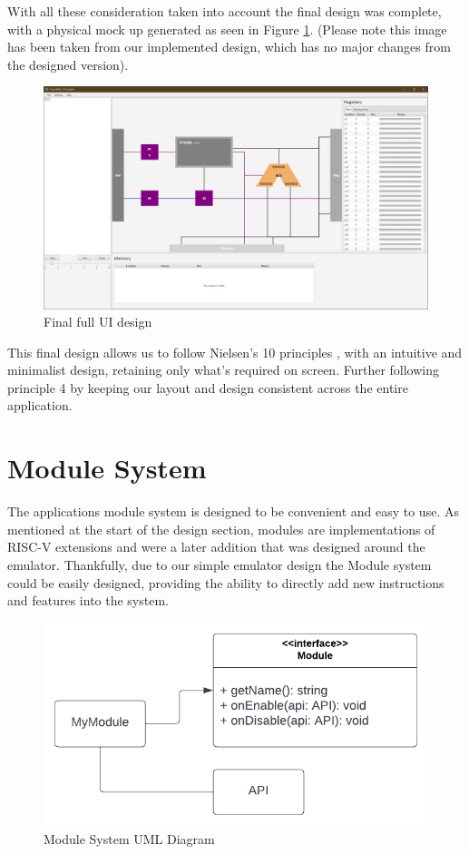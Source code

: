 With all these consideration taken into account the final design was complete, with a physical mock up generated as seen in Figure \ref{fig:final_implemented_design}. (Please note this image has been taken from our implemented design, which has no major changes from the designed version).

\begin{figure}[H]
    \centering
    \includegraphics[width=0.9\linewidth]{dissertation/DATA/final_design.jpg}
    \caption{Final full UI design}
    \label{fig:final_implemented_design}
\end{figure}

This final design allows us to follow Nielsen's 10 principles \cite{nielsen_2020_10}, with an intuitive and minimalist design, retaining only what's required on screen. Further following principle 4 by keeping our layout and design consistent across the entire application.

\section{Module System}\label{sec:module}
The applications module system is designed to be convenient and easy to use. As mentioned at the start of the design section, modules are implementations of RISC-V extensions and were a later addition that was designed around the emulator. Thankfully, due to our simple emulator design the Module system could be easily designed, providing the ability to directly add new instructions and features into the system.

\begin{figure}[H]
    \centering
    \includegraphics[width=0.9\linewidth]{dissertation/DATA/module uml.png}
    \caption{Module System UML Diagram}
    \label{fig:module_uml}
\end{figure}

